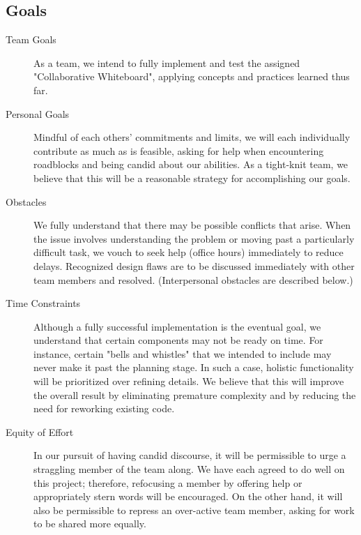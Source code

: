 \documentclass[twoside]{article}
\begin{document}
\begin{multicols}{2} %

%
%
%
%

\section{Goals}

\begin{description}
    \item[Team Goals] As a team, we intend to fully implement and test the assigned "Collaborative Whiteboard", applying concepts and practices learned thus far.
	\item[Personal Goals] Mindful of each others' commitments and limits, we will each individually contribute as much as is feasible, asking for help when encountering roadblocks and being candid about our abilities. As a tight-knit team, we believe that this will be a reasonable strategy for accomplishing our goals. 
	\item[Obstacles] We fully understand that there may be possible conflicts that arise. When the issue involves understanding the problem or moving past a particularly difficult task, we vouch to seek help (office hours) immediately to reduce delays. Recognized design flaws are to be discussed immediately with other team members and resolved. (Interpersonal obstacles are described below.)
	\item[Time Constraints] Although a fully successful implementation is the eventual goal, we understand that certain components may not be ready on time.  For instance, certain "bells and whistles" that we intended to include may never make it past the planning stage.  In such a case, holistic functionality will be prioritized over refining details.  We believe that this will improve the overall result by eliminating premature complexity and by reducing the need for reworking existing code.
	\item[Equity of Effort] In our pursuit of having candid discourse, it will be permissible to urge a straggling member of the team along. We have each agreed to do well on this project; therefore, refocusing a member by offering help or appropriately stern words will be encouraged.  On the other hand, it will also be permissible to repress an over-active team member, asking for work to be shared more equally.
\end{description}



\end{multicols}
\end{document}
